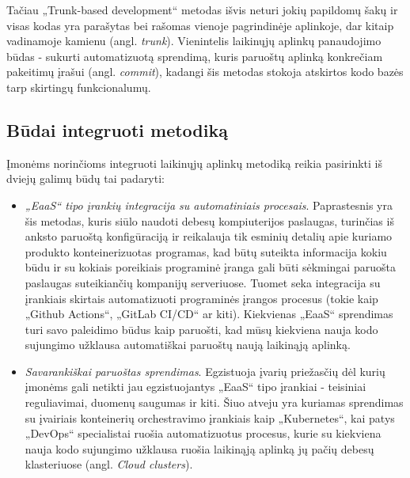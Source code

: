 \documentclass{VUMIFPSkursinis}
\begin{document}
Tačiau „Trunk-based development“ metodas išvis neturi jokių papildomų šakų ir visas kodas yra parašytas bei rašomas vienoje pagrindinėje aplinkoje, dar kitaip vadinamoje kamienu (angl. \textit{trunk}). Vienintelis laikinųjų aplinkų panaudojimo būdas - sukurti automatizuotą sprendimą, kuris paruoštų aplinką konkrečiam pakeitimų įrašui (angl. \textit{commit}), kadangi šis metodas stokoja atskirtos kodo bazės tarp skirtingų funkcionalumų.


\subsection{Būdai integruoti metodiką}

Įmonėms norinčioms integruoti laikinųjų aplinkų metodiką reikia pasirinkti iš dviejų galimų būdų tai padaryti:

\begin{itemize}
  \item \textit{„EaaS“ tipo įrankių integracija su automatiniais procesais}. Paprastesnis yra šis metodas, kuris siūlo naudoti debesų kompiuterijos paslaugas, turinčias iš anksto paruoštą konfigūraciją ir reikalauja tik esminių detalių apie kuriamo produkto konteinerizuotas programas, kad būtų suteikta informacija kokiu būdu ir su kokiais poreikiais programinė įranga gali būti sėkmingai paruošta paslaugas suteikiančių kompanijų serveriuose. Tuomet seka integracija su įrankiais skirtais automatizuoti programinės įrangos procesus (tokie kaip „Github Actions“, „GitLab CI/CD“ ar kiti). Kiekvienas „EaaS“ sprendimas turi savo paleidimo būdus kaip paruošti, kad mūsų kiekviena nauja kodo sujungimo užklausa automatiškai paruoštų naują laikinąją aplinką.

  \item \textit{Savarankiškai paruoštas sprendimas}. Egzistuoja įvarių priežasčių dėl kurių įmonėms gali netikti jau egzistuojantys „EaaS“ tipo įrankiai - teisiniai reguliavimai, duomenų saugumas ir kiti. Šiuo atveju yra kuriamas sprendimas su įvairiais konteinerių orchestravimo įrankiais kaip „Kubernetes“, kai patys „DevOps“ specialistai ruošia automatizuotus procesus, kurie su kiekviena nauja kodo sujungimo užklausa ruošia laikinąją aplinką jų pačių debesų klasteriuose (angl. \textit{Cloud clusters}).

\end{itemize}
\end{document}
